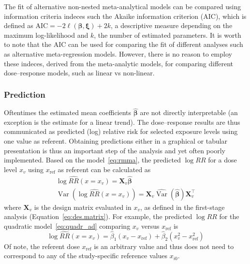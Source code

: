 \documentclass[11pt,a4paper,twoside,openany]{book}\usepackage{knitr}
\DeclareMathOperator{\Var}{Var}
\begin{document}
{The fit of alternative non-nested meta-analytical models can be compared using information criteria indeces such the Akaike information criterion (AIC), which is defined as $\textrm{AIC} = -2 \ell\left(\boldsymbol{\beta}, \boldsymbol{\xi} \right) + 2k$, a descriptive measure depending on the maximum log-likelihood and $k$, the number of estimated parameters. It is worth to note that the AIC can be used for comparing the fit of different analyses such as alternative meta-regression models. However, there is no reason to employ these indeces, derived from the meta-analytic models, for comparing different dose--response models, such as linear vs non-linear. 


\subsubsection*{Prediction}\label{sec:pred}

Oftentimes the estimated mean coefficients $\boldsymbol{\hat \beta}$ are not directly interpretable (an exception is the estimate for a linear trend). The dose--response results are thus communicated as predicted (log) relative risk for selected exposure levels using one value as referent. Obtaining predictions either in a graphical or tabular presentation is thus an important step of the analysis and yet often poorly implemented.
Based on the model~\ref{eq:rmma}, the predicted $\log RR$ for a dose level $x_v$ using $x_\mathrm{ref}$ as referent can be calculated as
\begin{align}
\log \widehat{RR}(x = x_v) = \mathbf{X}_v\boldsymbol{\hat \beta} \label{eq:pred} \\
\Var \left(\log \widehat{RR}(x = x_v) \right) = \mathbf{X}_v \widehat{\Var} \left( \boldsymbol{\hat \beta} \right) \mathbf{X}_v^\top \label{eq:varpred}
\end{align}
\noindent where $\mathbf{X}_v$ is the design matrix evaluated in $x_v$, as defined in the first-stage analysis (Equation~\ref{eq:des.matrix}). For example, the predicted $\log RR$ for the quadratic model~\ref{eq:quadr_ad} comparing $x_v$ versus $x_\mathrm{ref}$ is
\begin{equation*}
\log \widehat{RR}(x = x_v) = \hat \beta_1 \left(x_v - x_\mathrm{ref} \right) + \hat \beta_2 \left(x_v^2 - x_\mathrm{ref}^2 \right)
\end{equation*}
Of note, the referent dose $x_\mathrm{ref}$ is an arbitrary value and thus does not need to correspond to any of the study-specific reference values $x_{i0}$.

}
\end{document}

